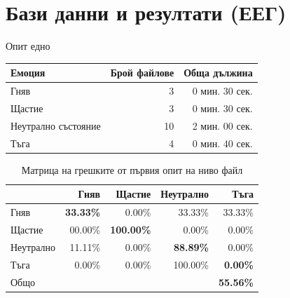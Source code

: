 \documentclass[9pt]{beamer}
\begin{document}
    \section{Бази данни и резултати (ЕЕГ)}
    \begin{frame}[t]{Опит едно}
        \pause
        \begin{center}
        \begin{tabular}{|l|r|r|} 
            \hline
            Емоция & Брой файлове & Обща дължина\\ 
            \hline
            Гняв & 3 & 0 мин. 30 сек.\\ 
            Щастие & 3 & 0 мин. 30 сек.\\ 
            Неутрално състояние & 10 & 2 мин. 00 сек. \\ 
            Тъга & 4 & 0 мин. 40 сек. \\ 
            \hline
        \end{tabular}
        \pause
        \begin{table}[h]
            \begin{center}
            \begin{tabular}{|l|r r r r|} 
                \hline
                & Гняв & Щастие & Неутрално & Тъга \\ 
                \hline
                Гняв &  \textbf{33.33\%} & 0.00\% & 33.33\% & 33.33\% \\ 
                Щастие & 00.00\% & \textbf{100.00\%} & 0.00\% & 0.00\% \\ 
                Неутрално & 11.11\% & 0.00\% & \textbf{88.89\%} & 0.00\% \\ 
                Тъга & 0.00\% & 0.00\% & 100.00\% & \textbf{0.00\%}\\ 
                \hline
                \hline
                Общо & & & & \textbf{55.56\%}\\
                \hline
            \end{tabular}
            \caption*{Матрица на грешките от първия опит на ниво файл}
            \end{center}
        \end{table}
        \end{center}
    \end{frame}
\end{document}
